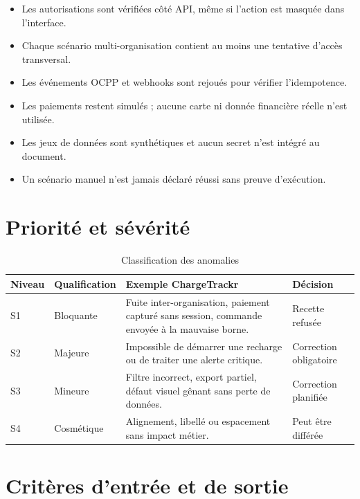 \begin{itemize}[leftmargin=6mm]
  \item Les autorisations sont vérifiées côté API, même si l'action est masquée
        dans l'interface.
  \item Chaque scénario multi-organisation contient au moins une tentative
        d'accès transversal.
  \item Les événements OCPP et webhooks sont rejoués pour vérifier
        l'idempotence.
  \item Les paiements restent simulés ; aucune carte ni donnée financière réelle
        n'est utilisée.
  \item Les jeux de données sont synthétiques et aucun secret n'est intégré au
        document.
  \item Un scénario manuel n'est jamais déclaré réussi sans preuve d'exécution.
\end{itemize}

\section{Priorité et sévérité}

\begin{table}[H]
\centering
\caption{Classification des anomalies}
\begin{tabularx}{\textwidth}{|C{1.7cm}|L{3.1cm}|Y|L{3cm}|}
\hline
{}\textbf{Niveau} & \textbf{Qualification} & \textbf{Exemple ChargeTrackr} & \textbf{Décision} \\ \hline
S1 & Bloquante & Fuite inter-organisation, paiement capturé sans session, commande envoyée à la mauvaise borne. & Recette refusée \\ \hline
S2 & Majeure & Impossible de démarrer une recharge ou de traiter une alerte critique. & Correction obligatoire \\ \hline
S3 & Mineure & Filtre incorrect, export partiel, défaut visuel gênant sans perte de données. & Correction planifiée \\ \hline
S4 & Cosmétique & Alignement, libellé ou espacement sans impact métier. & Peut être différée \\ \hline
\end{tabularx}
\end{table}

\section{Critères d'entrée et de sortie}

